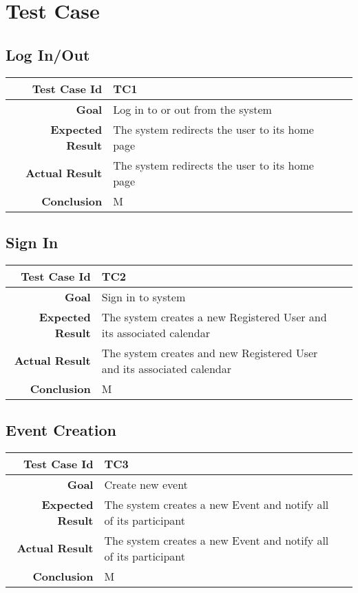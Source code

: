 \chapter{Test Case} \label{cap:cap3}
\section{Log In/Out}
\begin{tabularx}{\linewidth}{|r|X|X|}

  \hline   {\bf Test Case Id} &  TC1\\
  \hline  {\bf Goal} & Log in to or out from the system\\
  
  \hline  {\bf Expected Result} & The system redirects the user to its home page\\
  \hline  {\bf Actual Result} & The system redirects the user to its home page\\
  \hline  {\bf Conclusion} & M\\
  \hline
  
\end{tabularx}

\section{Sign In}
\begin{tabularx}{\linewidth}{|r|X|X|}

  \hline   {\bf Test Case Id} &  TC2\\
  \hline  {\bf Goal} & Sign in to system\\
  
  \hline  {\bf Expected Result} & The system creates a new Registered User and its associated calendar\\
  \hline  {\bf Actual Result} & The system creates and new Registered User and its associated calendar\\
  \hline  {\bf Conclusion} & M\\
  \hline
  
\end{tabularx}

\section{Event Creation}
\begin{tabularx}{\linewidth}{|r|X|X|}

  \hline   {\bf Test Case Id} &  TC3\\
  \hline  {\bf Goal} & Create new event\\
  
  \hline  {\bf Expected Result} & The system creates a new Event and notify all of its participant\\
  \hline  {\bf Actual Result} & The system creates a new Event and notify all of its participant\\
  \hline  {\bf Conclusion} & M\\
  \hline
  
\end{tabularx}
